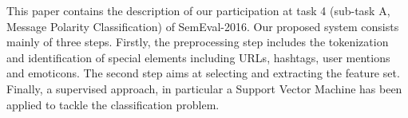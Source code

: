 This paper contains the description of our participation at task 4 (sub-task A, Message Polarity  Classification)  of  SemEval-2016.   Our proposed   system consists   mainly   of                                             three steps. Firstly, the preprocessing step includes the  tokenization  and                                            identification of special elements including URLs, hashtags, user mentions and emoticons.                                            The second step aims at selecting and extracting  the  feature  set.                                             Finally, a supervised approach, in particular a Support Vector Machine has been applied to tackle the classification problem.

